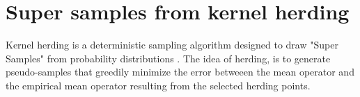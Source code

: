 \section{Super samples from kernel herding}
Kernel herding is a deterministic sampling algorithm designed to draw "Super Samples" from probability distributions \cite{supersamples}. The idea of herding, is to generate pseudo-samples that greedily minimize the error betweeen the mean operator and the empirical mean operator resulting from the selected herding points.


